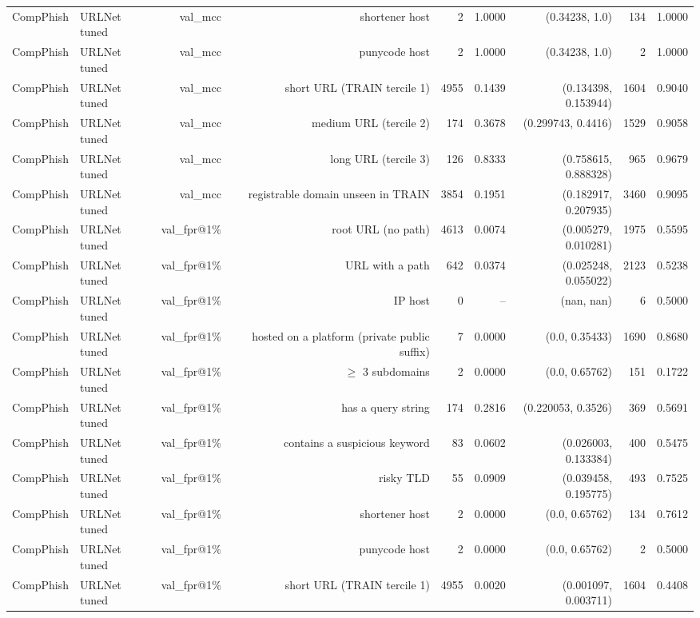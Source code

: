 \begin{table}[t]
\begin{tabular}{llrrrrrrr}
CompPhish & URLNet tuned & val\_mcc & shortener host & 2 & 1.0000 & (0.34238, 1.0) & 134 & 1.0000 \\
CompPhish & URLNet tuned & val\_mcc & punycode host & 2 & 1.0000 & (0.34238, 1.0) & 2 & 1.0000 \\
CompPhish & URLNet tuned & val\_mcc & short URL (TRAIN tercile 1) & 4955 & 0.1439 & (0.134398, 0.153944) & 1604 & 0.9040 \\
CompPhish & URLNet tuned & val\_mcc & medium URL (tercile 2) & 174 & 0.3678 & (0.299743, 0.4416) & 1529 & 0.9058 \\
CompPhish & URLNet tuned & val\_mcc & long URL (tercile 3) & 126 & 0.8333 & (0.758615, 0.888328) & 965 & 0.9679 \\
CompPhish & URLNet tuned & val\_mcc & registrable domain unseen in TRAIN & 3854 & 0.1951 & (0.182917, 0.207935) & 3460 & 0.9095 \\
CompPhish & URLNet tuned & val\_fpr@1\% & root URL (no path) & 4613 & 0.0074 & (0.005279, 0.010281) & 1975 & 0.5595 \\
CompPhish & URLNet tuned & val\_fpr@1\% & URL with a path & 642 & 0.0374 & (0.025248, 0.055022) & 2123 & 0.5238 \\
CompPhish & URLNet tuned & val\_fpr@1\% & IP host & 0 & -- & (nan, nan) & 6 & 0.5000 \\
CompPhish & URLNet tuned & val\_fpr@1\% & hosted on a platform (private public suffix) & 7 & 0.0000 & (0.0, 0.35433) & 1690 & 0.8680 \\
CompPhish & URLNet tuned & val\_fpr@1\% & $\geq$ 3 subdomains & 2 & 0.0000 & (0.0, 0.65762) & 151 & 0.1722 \\
CompPhish & URLNet tuned & val\_fpr@1\% & has a query string & 174 & 0.2816 & (0.220053, 0.3526) & 369 & 0.5691 \\
CompPhish & URLNet tuned & val\_fpr@1\% & contains a suspicious keyword & 83 & 0.0602 & (0.026003, 0.133384) & 400 & 0.5475 \\
CompPhish & URLNet tuned & val\_fpr@1\% & risky TLD & 55 & 0.0909 & (0.039458, 0.195775) & 493 & 0.7525 \\
CompPhish & URLNet tuned & val\_fpr@1\% & shortener host & 2 & 0.0000 & (0.0, 0.65762) & 134 & 0.7612 \\
CompPhish & URLNet tuned & val\_fpr@1\% & punycode host & 2 & 0.0000 & (0.0, 0.65762) & 2 & 0.5000 \\
CompPhish & URLNet tuned & val\_fpr@1\% & short URL (TRAIN tercile 1) & 4955 & 0.0020 & (0.001097, 0.003711) & 1604 & 0.4408 \\

\end{tabular}
\end{table}
